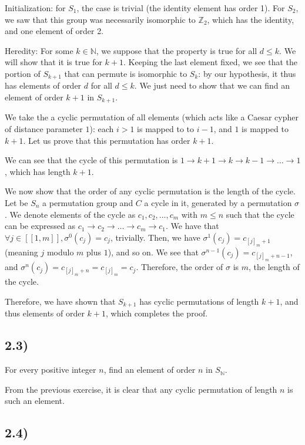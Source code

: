 Initialization: for $S_1$, the case is trivial (the identity element has order 1). For $S_2$, we saw that this group was necessarily isomorphic to $\mathbb{Z}_2$, which has the identity, and one element of order 2.

Heredity: For some $k \in \mathbb{N}$, we suppose that the property is true for all $d \leq k$. We will show that it is true for $k+1$. Keeping the last element fixed, we see that the portion of $S_{k+1}$ that can permute is isomorphic to $S_k$: by our hypothesis, it thus has elements of order $d$ for all $d \leq k$. We just need to show that we can find an element of order $k+1$ in $S_{k+1}$.

We take the a cyclic permutation of all elements (which acts like a Caesar cypher of distance parameter $1$): each $i > 1$ is mapped to to $i-1$, and $1$ is mapped to $k+1$. Let us prove that this permutation has order $k+1$.

We can see that the cycle of this permutation is $1 \rightarrow k+1 \rightarrow k \rightarrow k-1 \rightarrow \ldots \rightarrow 1$, which has length $k+1$.

We now show that the order of any cyclic permutation is the length of the cycle. Let be $S_n$ a permutation group and $C$ a cycle in it, generated by a permutation $\sigma$. We denote elements of the cycle as $c_1, c_2, \ldots, c_m$ with $m \leq n$ such that the cycle can be expressed as $c_1 \rightarrow c_2 \rightarrow \ldots \rightarrow c_m \rightarrow c_1$. We have that $\forall j \in [[1, m]], \sigma^0(c_j) = c_j$, trivially. Then, we have $\sigma^1(c_j) = c_{[j]_m + 1}$ (meaning $j$ modulo $m$ plus $1$), and so on. We see that $\sigma^{n-1}(c_j) = c_{[j]_m + n-1}$, and $\sigma^n(c_j) = c_{[j]_m + n} = c_{[j]_m} = c_j$. Therefore, the order of $\sigma$ is $m$, the length of the cycle.

Therefore, we have shown that $S_{k+1}$ has cyclic permutations of length $k+1$, and thus elements of order $k+1$, which completes the proof.


\subsection*{2.3)}

For every positive integer $n$, find an element of order $n$ in $S_\mathbb{N}$.

From the previous exercise, it is clear that any cyclic permutation of length $n$ is such an element.


\subsection*{2.4)}

